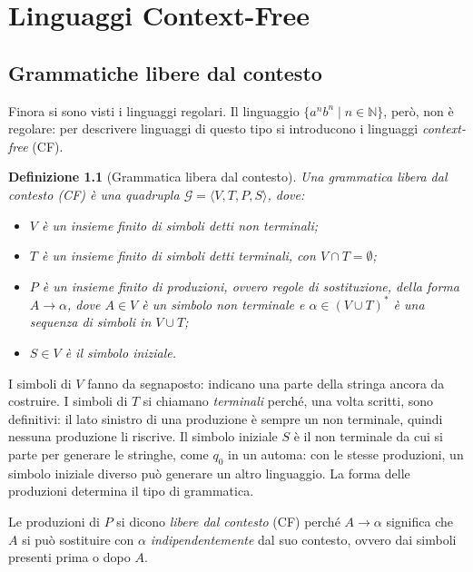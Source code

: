 \documentclass[a4paper, 11pt, oneside]{book}
\theoremstyle{formale}
\newtheorem*{definition}{Definizione}
\begin{document}
    \chapter{Linguaggi Context-Free}

    \section{Grammatiche libere dal contesto}
    Finora si sono visti i linguaggi regolari. Il linguaggio $\{a^n b^n \mid n \in
    \mathbb{N}\}$, per\`o, non \`e regolare: per descrivere linguaggi di questo tipo si
    introducono i linguaggi \emph{context-free} (CF).

    \begin{definition}[Grammatica libera dal contesto]
        Una \emph{grammatica libera dal contesto} (CF) \`e una quadrupla
        $\mathcal{G} = \langle V, T, P, S \rangle$, dove:
        \begin{itemize}
            \item $V$ \`e un insieme finito di simboli detti \emph{non terminali};
            \item $T$ \`e un insieme finito di simboli detti \emph{terminali}, con
                $V \cap T = \emptyset$;
            \item $P$ \`e un insieme finito di \emph{produzioni}, ovvero regole di
                sostituzione, della forma $A \to \alpha$, dove $A \in V$ \`e un simbolo non
                terminale e $\alpha \in (V \cup T)^*$ \`e una sequenza di simboli in
                $V \cup T$;
            \item $S \in V$ \`e il simbolo \emph{iniziale}.
        \end{itemize}
    \end{definition}
    I simboli di $V$ fanno da segnaposto: indicano una parte della stringa ancora da
    costruire. I simboli di $T$ si chiamano \emph{terminali} perch\'e, una volta scritti,
    sono definitivi: il lato sinistro di una produzione \`e sempre un non terminale, quindi
    nessuna produzione li riscrive. Il simbolo iniziale $S$ \`e il non terminale da cui si
    parte per generare le stringhe, come $q_0$ in un automa: con le stesse produzioni, un
    simbolo iniziale diverso pu\`o generare un altro linguaggio. La forma delle produzioni
    determina il tipo di grammatica.

    Le produzioni di $P$ si dicono \emph{libere dal contesto} (CF) perch\'e $A \to \alpha$
    significa che $A$ si pu\`o sostituire con $\alpha$ \emph{indipendentemente} dal suo
    contesto, ovvero dai simboli presenti prima o dopo $A$.
\end{document}

